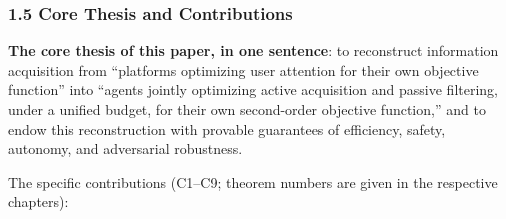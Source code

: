 \documentclass[
  11pt]{article}
\begin{document}
\subsubsection{1.5 Core Thesis and
Contributions}\label{core-thesis-and-contributions}

\textbf{The core thesis of this paper, in one sentence}: to reconstruct
information acquisition from ``platforms optimizing user attention for
their own objective function'' into ``agents jointly optimizing active
acquisition and passive filtering, under a unified budget, for their own
second-order objective function,'' and to endow this reconstruction with
provable guarantees of efficiency, safety, autonomy, and adversarial
robustness.

The specific contributions (C1--C9; theorem numbers are given in the
respective chapters):
\end{document}
